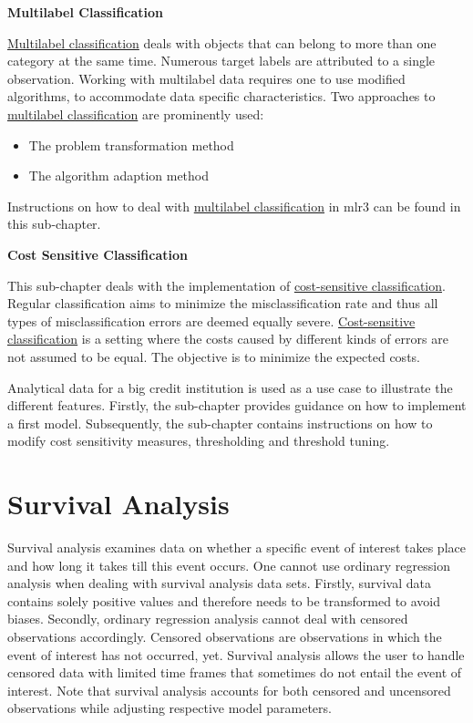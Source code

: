 \documentclass[
  11pt,
  parskip=half,
  DIV=calc,
  BCOR=10mm,
  x11names]{scrbook}
\providecommand{\tightlist}{%
  \setlength{\itemsep}{0pt}\setlength{\parskip}{0pt}}
\begin{document}
\textbf{Multilabel Classification}

\protect\hyperlink{multilabel}{Multilabel classification} deals with objects that can belong to more than one category at the same time.
Numerous target labels are attributed to a single observation.
Working with multilabel data requires one to use modified algorithms, to accommodate data specific characteristics.
Two approaches to \protect\hyperlink{multilabel}{multilabel classification} are prominently used:

\begin{itemize}
\tightlist
\item
  The problem transformation method
\item
  The algorithm adaption method
\end{itemize}

Instructions on how to deal with \protect\hyperlink{multilabel}{multilabel classification} in mlr3 can be found in this sub-chapter.

\textbf{Cost Sensitive Classification}

This sub-chapter deals with the implementation of \protect\hyperlink{cost-sens}{cost-sensitive classification}.
Regular classification aims to minimize the misclassification rate and thus all types of misclassification errors are deemed equally severe.
\protect\hyperlink{cost-sens}{Cost-sensitive classification} is a setting where the costs caused by different kinds of errors are not assumed to be equal.
The objective is to minimize the expected costs.

Analytical data for a big credit institution is used as a use case to illustrate the different features.
Firstly, the sub-chapter provides guidance on how to implement a first model.
Subsequently, the sub-chapter contains instructions on how to modify cost sensitivity measures, thresholding and threshold tuning.

\hypertarget{survival}{%
\section{Survival Analysis}\label{survival}}

Survival analysis examines data on whether a specific event of interest takes place and how long it takes till this event occurs.
One cannot use ordinary regression analysis when dealing with survival analysis data sets.
Firstly, survival data contains solely positive values and therefore needs to be transformed to avoid biases.
Secondly, ordinary regression analysis cannot deal with censored observations accordingly.
Censored observations are observations in which the event of interest has not occurred, yet.
Survival analysis allows the user to handle censored data with limited time frames that sometimes do not entail the event of interest.
Note that survival analysis accounts for both censored and uncensored observations while adjusting respective model parameters.
\end{document}
